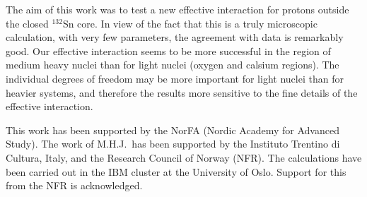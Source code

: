 The aim of this work was to test a new effective interaction for
protons outside the closed $^{132}$Sn core. In view of the fact that 
this is a truly  microscopic calculation, with very few 
parameters, the agreement with data is remarkably good.
Our effective interaction seems to be more successful in the region of 
medium heavy nuclei than for light nuclei (oxygen and calsium regions). 
The individual degrees of freedom may be more important for light nuclei than 
for heavier systems, and therefore the results more sensitive to 
the fine details of the effective interaction.

This work has been supported by the NorFA (Nordic Academy for Advanced Study).
The work of M.H.J.\ has been supported
by  the Instituto Trentino di Cultura, Italy, and the Research 
Council of Norway (NFR). The calculations have been 
carried out in the IBM cluster at the University of Oslo. Support for this
from the NFR is acknowledged.

